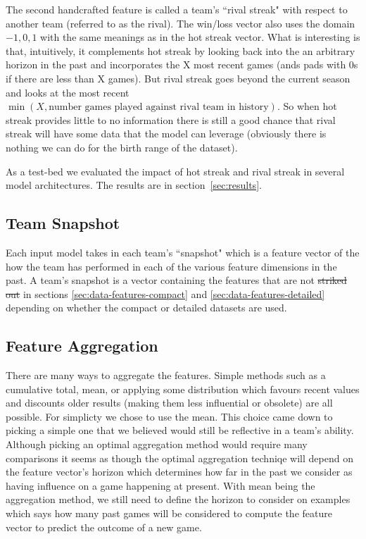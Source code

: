\documentclass{article} %
\begin{document}
The second handcrafted feature is called a team's ``rival streak" with respect to another team (referred to as the rival). The win/loss vector also uses the domain ${-1, 0, 1}$ with the same meanings as in the hot streak vector.
What is interesting is that, intuitively, it complements hot streak by looking back into the an arbitrary horizon in the past and incorporates the X most recent games (ands pads with 0s if there are less than X games).
But rival streak goes beyond the current season and looks at the most recent $\min(X, \text{number games played against rival team in history})$.
So when hot streak provides little to no information there is still a good chance that rival streak will have some data that the model can leverage (obviously there is nothing we can do for the birth range of the dataset).

As a test-bed we evaluated the impact of hot streak and rival streak in several model architectures.
The results are in section~\ref{sec:results}.



\subsection{Team Snapshot}
\label{sec:data-team-snapshot}

Each input model takes in each team's ``snapshot" which is a feature vector of the how the team has performed in each of the various feature dimensions in the past.
A team's snapshot is a vector containing the features that are not \sout{striked out} in sections \ref{sec:data-features-compact} and \ref{sec:data-features-detailed} depending on whether the compact or detailed datasets are used.

\subsection{Feature Aggregation}
\label{sec:feature-aggregation}

There are many ways to aggregate the features.
Simple methods such as a cumulative total, mean, or applying some distribution which favours recent values and discounts older results (making them less influential or obsolete) are all possible.
For simplicty we chose to use the mean.
This choice came down to picking a simple one that we believed would still be reflective in a team's ability.
Although picking an optimal aggregation method would require many comparisons it seems as though the optimal aggregation techniqe will depend on the feature vector's horizon which determines how far in the past we consider as having influence on a game happening at present.
With mean being the aggregation method, we still need to define the horizon to consider on examples which says how many past games will be considered to compute the feature vector to predict the outcome of a new game.
\end{document}
